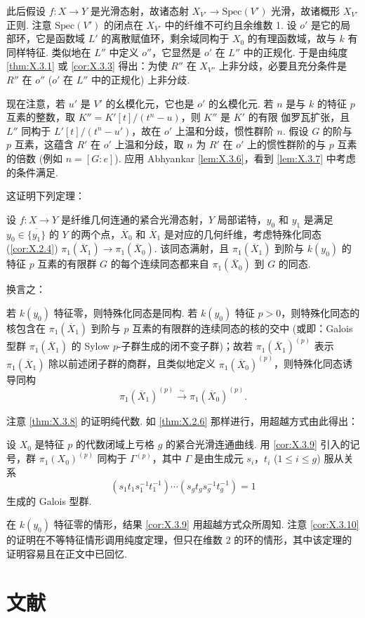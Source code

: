此后假设 $f \colon X \to Y$ 是光滑态射，故诸态射 $X_{V'} \to \mathrm{Spec}(V')$ 光滑，故诸概形 $X_{V'}$ 正则. 注意 $\mathrm{Spec}(V')$ 的闭点在 $X_{V'}$ 中的纤维不可约且余维数 1. 设 $o'$ 是它的局部环，它是函数域 $L'$ 的离散赋值环，剩余域同构于 $X_0$ 的有理函数域，故与 $k$ 有同样特征. 类似地在 $L''$ 中定义 $o''$，它显然是 $o'$ 在 $L''$ 中的正规化. 于是由纯度\cref{thm:X.3.1} 或 \ref{cor:X.3.3} 得出：为使 $R''$ 在 $X_{V''}$ 上非分歧，必要且充分条件是 $R''$ 在 $o''$ ($o'$ 在 $L''$ 中的正规化) 上非分歧.

现在注意，若 $u'$ 是 $V'$ 的幺模化元，它也是 $o'$ 的幺模化元. 若 $n$ 是与 $k$ 的特征 $p$ 互素的整数，取 $K'' = K'[t]/(t^n - u)$，则 $K''$ 是 $K'$ 的有限 伽罗瓦扩张，且 $L''$ 同构于 $L'[t]/(t^n - u')$，故在 $o'$ 上温和分歧，惯性群阶 $n$. 假设 $G$ 的阶与 $p$ 互素，这蕴含 $R'$ 在 $o'$ 上温和分歧，取 $n$ 为 $R'$ 在 $o'$ 上的惯性群阶的与 $p$ 互素的倍数 (例如 $n = [G : e]$). 应用 Abhyankar \cref{lem:X.3.6}，看到 \ref{lem:X.3.7} 中考虑的条件满足.

这证明下列定理：

\begin{theorem}\label{thm:X.3.8}
设 $f \colon X \to Y$ 是纤维几何连通的紧合光滑态射，$Y$ 局部诺特，$y_0$ 和 $y_1$ 是满足 $y_0 \in \overline{\{y_1\}}$ 的 $Y$ 的两个点，$\overline{X}_0$ 和 $\overline{X}_1$ 是对应的几何纤维，考虑特殊化同态 (\cref{cor:X.2.4}) $\pi_1(\overline{X}_1) \to \pi_1(\overline{X}_0)$. 该同态满射，且 $\pi_1(\overline{X}_1)$ 到阶与 $k(y_0)$ 的特征 $p$ 互素的有限群 $G$ 的每个连续同态都来自 $\pi_1(\overline{X}_0)$ 到 $G$ 的同态.
\end{theorem}

换言之：

\begin{corollary}\label{cor:X.3.9}
若 $k(y_0)$ 特征零，则特殊化同态是同构. 若 $k(y_0)$ 特征 $p > 0$，则特殊化同态的核包含在 $\pi_1(\overline{X}_1)$ 到阶与 $p$ 互素的有限群的连续同态的核的交中 (或即：Galois 型群 $\pi_1(\overline{X}_1)$ 的 Sylow $p$-子群生成的闭不变子群)；故若 $\pi_1(\overline{X}_1)^{(p)}$ 表示 $\pi_1(\overline{X}_1)$ 除以前述闭子群的商群，且类似地定义 $\pi_1(\overline{X}_0)^{(p)}$，则特殊化同态诱导同构
\[
\pi_1(\overline{X}_1)^{(p)} \xrightarrow{\sim} \pi_1(\overline{X}_0)^{(p)}.
\]
\end{corollary}

注意 \ref{thm:X.3.8} 的证明纯代数. 如 \ref{thm:X.2.6} 那样进行，用超越方式由此得出：

\begin{corollary}\label{cor:X.3.10}
设 $X_0$ 是特征 $p$ 的代数闭域上亏格 $g$ 的紧合光滑连通曲线. 用 \ref{cor:X.3.9} 引入的记号，群 $\pi_1(X_0)^{(p)}$ 同构于 $\Gamma^{(p)}$，其中 $\Gamma$ 是由生成元 $s_i$，$t_i$ ($1 \leqslant i \leqslant g$) 服从关系
\[
(s_1 t_1 s_1^{-1} t_1^{-1}) \cdots (s_g t_g s_g^{-1} t_g^{-1}) = 1
\]
生成的 Galois 型群.
\end{corollary}

\begin{remark}\label{rem:X.3.11}
在 $k(y_0)$ 特征零的情形，结果 \ref{cor:X.3.9} 用超越方式众所周知. 注意 \ref{cor:X.3.10} 的证明在不等特征情形调用纯度定理，但只在维数 2 的环的情形，其中该定理的证明容易且在正文中已回忆.
\end{remark}

\section{文献}\printbibliography[heading=none]


